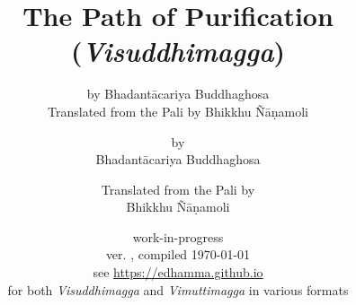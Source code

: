 


	\title{The Path of Purification \\ (\emph{Visuddhimagga})}
	\date{work-in-progress \\ ver. \vismCommitHref, compiled \today \\ see \url{https://edhamma.github.io}  \\ for both \emph{Visuddhimagga} and \emph{Vimuttimagga} in various formats}
	\ifplastex
		\author{by Bhadantācariya Buddhaghosa \\ Translated from the Pali by Bhikkhu Ñāṇamoli}
	\else
		\author{by \\ Bhadantācariya Buddhaghosa \and Translated from the Pali by \\ Bhikkhu Ñāṇamoli}
	\fi
	\maketitle

	\frontmatter
		\bgroup
			\ifplastex\else\renewcommand{\baselinestretch}{0.2}\normalsize\fi
			\tableofcontents
		\egroup
		

